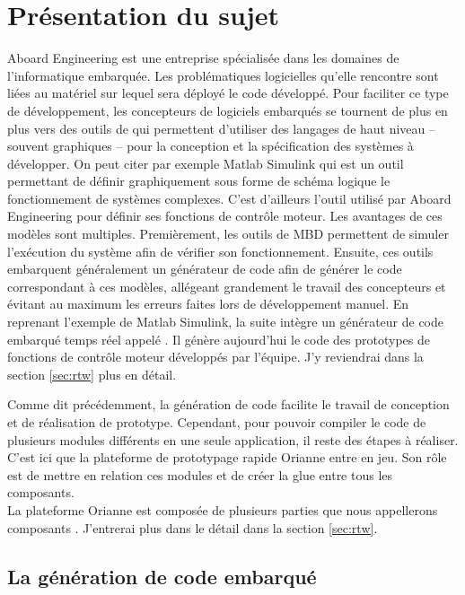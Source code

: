 \chapter{Présentation du sujet}
Aboard Engineering est une entreprise spécialisée dans les domaines de
l'informatique embarquée. Les problématiques logicielles qu'elle rencontre sont
liées au matériel sur lequel sera déployé le code développé. Pour faciliter ce
type de développement, les concepteurs de logiciels embarqués se tournent de
plus en plus vers des outils de  qui permettent d'utiliser des langages
de haut niveau -- souvent graphiques -- pour la conception et la spécification
des systèmes à développer. On peut citer par exemple Matlab\up{\circledR}
Simulink\up{\circledR} qui est un outil permettant de définir graphiquement sous
forme de schéma logique le fonctionnement de systèmes complexes. C'est
d'ailleurs l'outil utilisé par Aboard Engineering pour définir ses fonctions de
contrôle moteur. Les avantages de ces modèles sont multiples. Premièrement, les
outils de MBD permettent de simuler l'exécution du système afin de
vérifier son fonctionnement. Ensuite, ces outils embarquent généralement un
générateur de code afin de générer le code correspondant à ces modèles,
allégeant grandement le travail des concepteurs et évitant au maximum les
erreurs faites lors de développement \og manuel\fg{}. En reprenant l'exemple de
Matlab\up{\circledR} Simulink\up{\circledR}, la suite intègre un générateur de
code embarqué temps réel appelé . Il génère aujourd'hui le code des
prototypes de fonctions de contrôle moteur développés par l'équipe. J'y
reviendrai dans la section \ref{sec:rtw} plus en détail.

Comme dit précédemment, la génération de code facilite le travail de conception
et de réalisation de prototype. Cependant, pour pouvoir compiler le code de
plusieurs modules différents en une seule application, il reste des étapes à
réaliser. C'est ici que la plateforme de prototypage rapide Orianne
entre en jeu. Son rôle est de mettre en relation ces modules et de créer la
\og glue \fg{} entre tous les composants.\\
La plateforme Orianne est composée de plusieurs parties que nous appellerons \og
composants \fg{}. J'entrerai plus dans le détail dans la section \ref{sec:rtw}.

\section{La génération de code embarqué}
